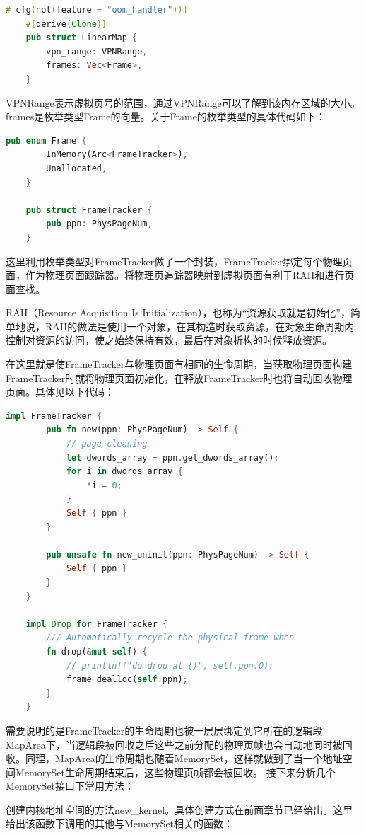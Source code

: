 \begin{lstlisting}[language={Rust}, caption={LinearMap}]
	#[cfg(not(feature = "oom_handler"))]
	#[derive(Clone)]
	pub struct LinearMap {
		vpn_range: VPNRange,
		frames: Vec<Frame>,
	}
\end{lstlisting}
VPNRange表示虚拟页号的范围，通过VPNRange可以了解到该内存区域的大小。frames是枚举类型Frame的向量。关于Frame的枚举类型的具体代码如下：

\begin{lstlisting}[language={Rust}, caption={Frame}]
	pub enum Frame {
		InMemory(Arc<FrameTracker>),
		Unallocated,
	}
	
	pub struct FrameTracker {
		pub ppn: PhysPageNum,
	}
\end{lstlisting}

这里利用枚举类型对FrameTracker做了一个封装，FrameTracker绑定每个物理页面，作为物理页面跟踪器。将物理页追踪器映射到虚拟页面有利于RAII和进行页面查找。

RAII（Resource Acquisition Is Initialization），也称为“资源获取就是初始化”，简单地说，RAII的做法是使用一个对象，在其构造时获取资源，在对象生命周期内控制对资源的访问，使之始终保持有效，最后在对象析构的时候释放资源。

在这里就是使FrameTracker与物理页面有相同的生命周期，当获取物理页面构建FrameTracker时就将物理页面初始化，在释放FrameTracker时也将自动回收物理页面。具体见以下代码：

\begin{lstlisting}[language={Rust}, caption={FrameTracker}]
	impl FrameTracker {
		pub fn new(ppn: PhysPageNum) -> Self {
			// page cleaning
			let dwords_array = ppn.get_dwords_array();
			for i in dwords_array {
				*i = 0;
			}
			Self { ppn }
		}
		
		pub unsafe fn new_uninit(ppn: PhysPageNum) -> Self {
			Self { ppn }
		}
	}
	
	impl Drop for FrameTracker {
		/// Automatically recycle the physical frame when
		fn drop(&mut self) {
			// println!("do drop at {}", self.ppn.0);
			frame_dealloc(self.ppn);
		}
	}
\end{lstlisting}

需要说明的是FrameTracker的生命周期也被一层层绑定到它所在的逻辑段MapArea下，当逻辑段被回收之后这些之前分配的物理页帧也会自动地同时被回收。同理，MapArea的生命周期也随着MemorySet，这样就做到了当一个地址空间MemorySet生命周期结束后，这些物理页帧都会被回收。
接下来分析几个MemorySet接口下常用方法：

创建内核地址空间的方法new\_kernel。具体创建方式在前面章节已经给出。这里给出该函数下调用的其他与MemorySet相关的函数：


